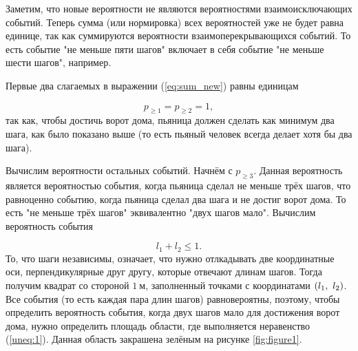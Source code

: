 \documentclass[12pt]{article}
\begin{document}
\par Заметим, что новые вероятности не являются вероятностями взаимоисключающих событий. Теперь сумма (или нормировка) всех вероятностей уже не будет равна единице, так как суммируются вероятности взаимоперекрывающихся событий. То есть событие "{}не меньше пяти шагов"{} включает в себя событие "{}не меньше шести шагов"{}, например.

\par Первые два слагаемых в выражении (\ref{eq:sum_new}) равны единицам

\begin{equation}
	p_{\ge 1} = p_{\ge 2} = 1,
\end{equation}
так как, чтобы достичь ворот дома, пьяница должен сделать как минимум два шага, как было показано выше (то есть пьяный человек всегда делает хотя бы два шага).

\par Вычислим вероятности остальных событий. Начнём с $p_{\ge 3}$. Данная вероятность является вероятностью события, когда пьяница сделал не меньше трёх шагов, что равноценно событию, когда пьяница сделал два шага и не достиг ворот дома. То есть "{}не меньше трёх шагов"{} эквивалентно "{}двух шагов мало"{}. Вычислим вероятность события 

\begin{equation} \label{uneq:1}
	l_1 + l_2 \le 1.
\end{equation}
То, что шаги независимы, означает, что нужно отлкадывать две координатные оси, перпендикулярные друг другу, которые отвечают длинам шагов. Тогда получим квадрат со стороной $1\ \text{м}$, заполненный точками с координатами $\qty(l_1,\ l_2)$. Все события (то есть каждая пара длин шагов) равновероятны, поэтому, чтобы определить вероятность события, когда двух шагов мало для достижения ворот дома, нужно определить площадь области, где выполняется неравенство (\ref{uneq:1}). Данная область закрашена зелёным на рисунке \ref{fig:figure1}.
\end{document}
